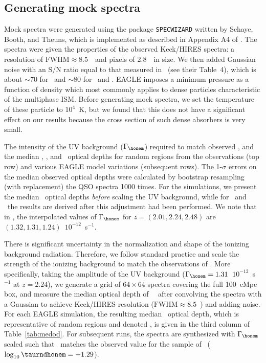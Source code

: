 \documentclass[useAMS,usenatbib,letterpaper]{mn2e}
\def\obspaper{\citetalias{turner14}}
\begin{document}
\subsection{Generating mock spectra}
\label{sec:gms}
 
 

Mock spectra were generated using the package
\texttt{SPECWIZARD} written by Schaye, Booth, and Theuns, which is implemented 
as described in  Appendix A4 of \citet{theuns1998}. 
The spectra were given the properties of the observed Keck/HIRES spectra:
a resolution of $\text{FWHM}\approx8.5$~\kmps\ and 
pixels of 2.8~\kmps\ in size. We then added Gaussian noise with 
an S/N ratio equal to that measured in \obspaper\ (see their Table~4),
which is about $\sim70$ for \hone\ and $\sim80$ for \cfour\ and \sifour. 
EAGLE imposes a minimum pressure as a function of density which 
most commonly applies to dense particles characteristic
of the multiphase ISM. 
 Before generating mock spectra,
we set the temperature of these particle to $10^4$~K, but we found that this
does not have a significant effect on our results because the cross section
of such dense absorbers is very small. 


 
 \begin{table*}
 \caption{The intensity of the UV background ($\Gamma_{\honem}$) required to match
 observed \taurndhone, 
 and the median \hone, \cfour, and \sifour\ optical depths for random regions
 from the observations (top row) and various EAGLE model variations (subsequent rows). 
 The 1-$\sigma$ errors on the median observed optical depths
 were calculated by bootstrap resampling (with replacement) the QSO spectra 1000 times.
 For the simulations, we present the median \hone\ optical depths \textit{before} scaling 
  the UV background, while for \cfour\ and \sifour\ the results are derived after this 
  adjustment had been performed.  We note that in \citet{haardt01}, the interpolated 
  values of $\Gamma_{\honem}$ for $z=(2.01, 2.24, 2.48)$ 
  are $(1.32,1.31,1.24)$~$10^{-12}$~s$^{-1}$. }

\label{tab:medod}
\end{table*}



There is significant uncertainty in the normalization and shape of the 
ionizing background radiation. Therefore, we follow standard practice \citep[e.g.,][]{rakic13} 
and scale the strength of the ionizing background to match the observations of \hone.
More specifically, taking the \citet{haardt01} amplitude of the UV background
($\Gamma_{\honem}=1.31$~$10^{-12}$~s$^{-1}$ at $z=2.24$), 
we generate a grid of $64\times64$ spectra covering the full 100~cMpc box,
and measure the median optical depth of \hone\ \lya\ after convolving the spectra
with a Gaussian to achieve Keck/HIRES resolution ($\text{FWHM}\approx8.5$~\kmps) and adding noise.
For each EAGLE simulation, the resulting median \hone\ optical depth, which is representative of
random regions and denoted \taurndhone, 
is given in the third column of Table~\ref{tab:medod}. For subsequent runs,
the spectra are synthesized with $\Gamma_{\honem}$
scaled such that \taurndhone\ matches the observed value
for the sample of \obspaper\ ($\log_{10} \taurndhonem =-1.29$). 
\end{document}
